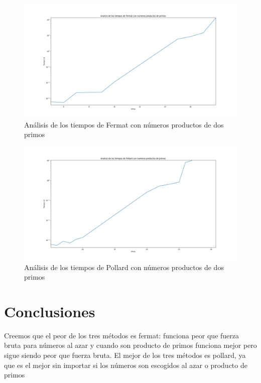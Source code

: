 \documentclass{article}
\begin{document}
    \begin{figure}[ht!]
        \centering
        \includegraphics[scale=0.3]{Figure_4}
        \caption{Análisis de los tiempos de Fermat con números productos de dos primos}
        \label{fig:Figure_4}
    \end{figure}

    \begin{figure}[ht!]
        \centering
        \includegraphics[scale=0.3]{Figure_6}
        \caption{Análisis de los tiempos de Pollard con números productos de dos primos}
        \label{fig:Figure_6}
    \end{figure}

    \newpage

    \section{Conclusiones}
    Creemos que el peor de los tres métodos es fermat: funciona peor que fuerza bruta para números al azar y cuando son producto de primos funciona mejor pero sigue siendo peor que fuerza bruta. El mejor de los tres métodos es pollard, ya que es el mejor sin importar si los números son escogidos al azar o producto de primos
\end{document}
